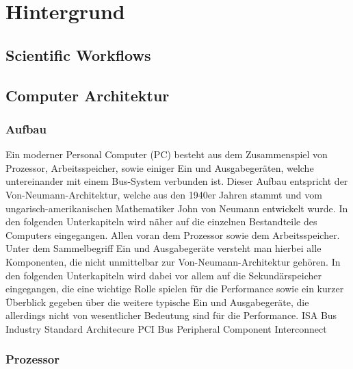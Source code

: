 \cleardoublepage
\chapter{Hintergrund}

\section{Scientific Workflows}
\label{sec:workflows}


\section{Computer Architektur}
\label{sec:architecture}

\subsection{Aufbau}
\label{subsec:aufbau}

Ein moderner Personal Computer (PC) besteht aus dem Zusammenspiel von Prozessor, Arbeitsspeicher, sowie einiger Ein und Ausgabegeräten, welche untereinander mit einem Bus-System verbunden ist. Dieser Aufbau entspricht der Von-Neumann-Architektur, welche aus den 1940er Jahren stammt und vom ungarisch-amerikanischen Mathematiker John von Neumann entwickelt wurde. 
In den folgenden Unterkapiteln wird näher auf die einzelnen Bestandteile des Computers eingegangen. Allen voran dem Prozessor sowie dem Arbeitsspeicher.
Unter dem Sammelbegriff Ein und Ausgabegeräte versteht man hierbei alle Komponenten, die nicht unmittelbar zur Von-Neumann-Architektur gehören. In den folgenden Unterkapiteln wird dabei vor allem auf die Sekundärspeicher eingegangen, die eine wichtige Rolle spielen für die Performance sowie ein kurzer Überblick gegeben über die weitere typische Ein und Ausgabegeräte, die allerdings nicht von wesentlicher Bedeutung sind für die Performance.
ISA Bus Industry Standard Architecure
PCI Bus Peripheral Component Interconnect



\subsection{Prozessor}
\label{subsec:cpu}

